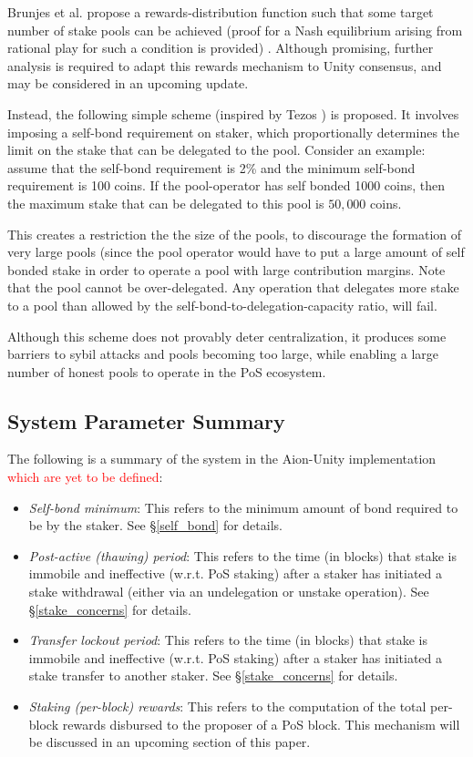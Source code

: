 Brunjes et al. propose a rewards-distribution function such that some target number of stake pools can be achieved (proof for a Nash equilibrium arising from rational play for such a condition is provided) \cite{BKK+18}. Although promising, further analysis is required to adapt this rewards mechanism to Unity consensus, and may be considered in an upcoming update. 

Instead, the following simple scheme (inspired by Tezos \cite{Goo14}) is proposed. It involves imposing a self-bond requirement on staker, which proportionally determines the limit on the stake that can be delegated to the pool. Consider an example: assume that the self-bond requirement is 2\% and the minimum self-bond requirement is 100 coins. If the pool-operator has self bonded 1000 coins, then the maximum stake that can be delegated to this pool is $50,000$ coins.   

This creates a restriction the the size of the pools, to discourage the formation of very large pools (since the pool operator would have to put a large amount of self bonded stake in order to operate a pool with large contribution margins. Note that the pool cannot be over-delegated. Any operation that delegates more stake to a pool than allowed by the self-bond-to-delegation-capacity ratio, will fail. 

Although this scheme does not provably deter centralization, it produces some barriers to sybil attacks and pools becoming too large, while enabling a large number of honest pools to operate in the PoS ecosystem.

\subsection{System Parameter Summary} \label{unspecified_parameters}
The following is a summary of the system in the Aion-Unity implementation \textcolor{red}{which are yet to be defined}: 
\begin{itemize}
    \item \textit{Self-bond minimum}: This refers to the minimum amount of bond required to be  by the staker. See \S\ref{self_bond} for details.
    \item \textit{Post-active (thawing) period}: This refers to the time (in blocks) that stake is immobile and ineffective (w.r.t. PoS staking) after a staker has initiated a stake withdrawal (either via an undelegation or unstake operation). See \S\ref{stake_concerns} for details. 
    \item \textit{Transfer lockout period}: This refers to the time (in blocks) that stake is immobile and ineffective (w.r.t. PoS staking) after a staker has initiated a stake transfer to another staker. See \S\ref{stake_concerns} for details. 
    \item \textit{Staking (per-block) rewards}: This refers to the computation of the total per-block rewards disbursed to the proposer of a PoS block. This mechanism will be discussed in an upcoming section of this paper. 
\end{itemize}

